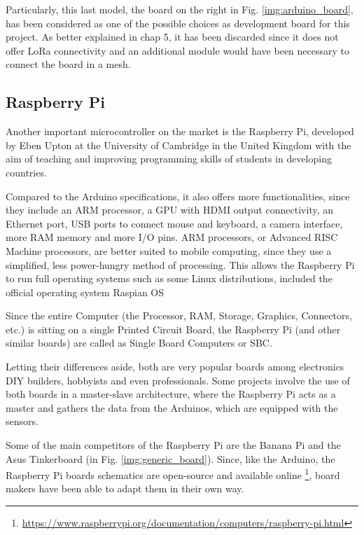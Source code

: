 		Particularly, this last model, the board on the right in Fig. \ref{img:arduino_board}, has been considered as one of the possible choices as development board for this project.
		As better explained in chap 5, it has been discarded since it does not offer LoRa connectivity and an additional module would have been necessary to connect the board in a mesh.
							
	\subsection{Raspberry Pi}

		Another important microcontroller on the market is the Raspberry Pi, developed by Eben Upton at the University of Cambridge in the United Kingdom with the aim of teaching and improving programming skills of students in developing countries.
		
		Compared to the Arduino specifications, it also offers more functionalities, since they include an ARM processor, a GPU with HDMI output connectivity, an Ethernet port, USB ports to connect mouse and keyboard, a camera interface, more RAM memory and more I/O pins.
		ARM processors, or Advanced RISC Machine processors, are better suited to mobile computing, since they use a simplified, less power-hungry method of processing.
		This allows the Raspberry Pi to run full operating systems such as some Linux distributions, included the official operating system Raspian OS
		
		Since the entire Computer (the Processor, RAM, Storage, Graphics, Connectors, etc.) is sitting on a single Printed Circuit Board, the Raspberry Pi (and other similar boards) are called as Single Board Computers or SBC.
		
		Letting their differences aside, both are very popular boards among electronics DIY builders, hobbyists and even professionals.
		Some projects involve the use of both boards in a master-slave architecture, where the Raspberry Pi acts as a master and gathers the data from the Arduinos, which are equipped with the sensors.
		
		Some of the main competitors of the Raspberry Pi are the Banana Pi and the Asus Tinkerboard (in Fig. \ref{img:generic_board}).
		Since, like the Arduino, the Raspberry Pi boards schematics are open-source and available online \footnote{\url{https://www.raspberrypi.org/documentation/computers/raspberry-pi.html}}, board makers have been able to adapt them in their own way.

